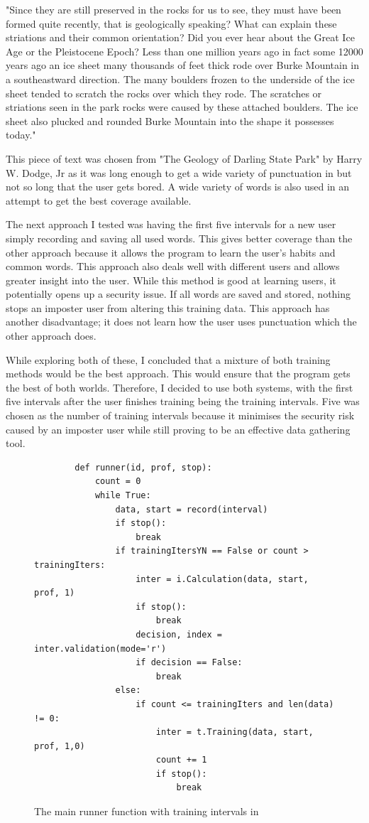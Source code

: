 \documentclass[10pt,a4paper]{report}
\begin{document}
"Since they are still preserved in the rocks for us to see, they must have been formed quite recently, that is geologically speaking?
What can explain these striations and their common orientation?			
Did you ever hear about the Great Ice Age or the Pleistocene Epoch?			
Less than one million years ago	in fact	some 12000 years ago an ice sheet many thousands of feet thick rode over Burke Mountain in a southeastward direction.
The many boulders frozen to the underside of the ice sheet tended to scratch the rocks over which they rode.			
The scratches or striations seen in the park rocks were caused by these attached boulders.				
The ice sheet also plucked and rounded Burke Mountain into the shape it possesses today."\cite{dodge_1967}

This piece of text was chosen from "The Geology of Darling State Park" by Harry W. Dodge, Jr\cite{dodge_1967} as it was long enough to get a wide variety of punctuation in but not so long that the user gets bored. A wide variety of words is also used in an attempt to get the best coverage available.

The next approach I tested was having the first five intervals for a new user simply recording and saving all used words. This gives better coverage than the other approach because it allows the program to learn the user’s habits and common words. This approach also deals well with different users and allows greater insight into the user. While this method is good at learning users, it potentially opens up a security issue. If all words are saved and stored, nothing stops an imposter user from altering this training data. This approach has another disadvantage; it does not learn how the user uses punctuation which the other approach does.

While exploring both of these, I concluded that a mixture of both training methods would be the best approach. This would ensure that the program gets the best of both worlds. Therefore, I decided to use both systems, with the first five intervals after the user finishes training being the training intervals. Five was chosen as the number of training intervals because it minimises the security risk caused by an imposter user while still proving to be an effective data gathering tool.

\begin{figure}
	\begin{lstlisting}
		def runner(id, prof, stop):
    		count = 0
    		while True:
        		data, start = record(interval)
        		if stop():
            		break
        		if trainingItersYN == False or count > trainingIters:
            		inter = i.Calculation(data, start, prof, 1)
            		if stop():
                		break
            		decision, index = inter.validation(mode='r')
           			if decision == False:
                		break
        		else:
           			if count <= trainingIters and len(data) != 0:
                		inter = t.Training(data, start, prof, 1,0)
                		count += 1
                		if stop():
                   			break
      \end{lstlisting}
      \caption{The main runner function with training intervals in}
      \label{fig:runner}
\end{figure}
\end{document}
